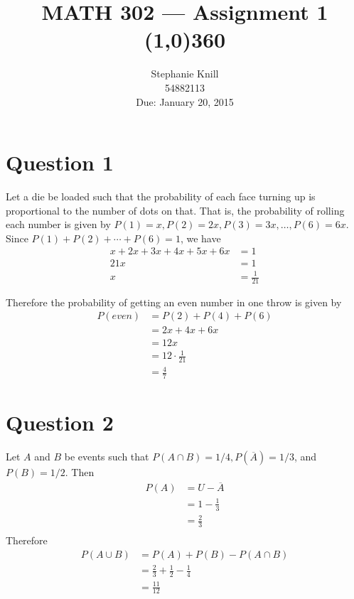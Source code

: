 \documentclass[11pt, oneside]{article}   	%
\begin{document}
\title{MATH 302 --- Assignment 1 \\
\line(1,0){360} \\              %
\vspace{0.2cm}}
\author{
Stephanie Knill \\
54882113 \\
Due: January 20, 2015}

\date{}                   %
\maketitle

\thispagestyle{empty}                   %



\section*{Question 1}

Let a die be loaded such that the probability of each face turning up is proportional to the number of dots on that. That is, the probability of rolling each number is given by $P(1)=x, P(2)=2x, P(3)=3x, \ldots , P(6)=6x$. Since $P(1) + P(2) + \cdots + P(6) = 1$, we have
\begin{align*}
x+2x+3x+4x+5x+6x & = 1 \\
21x & = 1 \\
x & = \frac{1}{21}
\end{align*}

Therefore the probability of getting an even number in one throw is given by
\begin{align*}
P(even) & = P(2)+P(4)+P(6) \\
& = 2x+4x+6x \\
& = 12x \\
& = 12 \cdot \frac{1}{21} \\
& = \frac{4}{7}
\end{align*}


\section*{Question 2}

Let $A$ and $B$ be events such that $P(A \cap B) = 1/4, P(\overline{A}) =1/3$, and $P(B)=1/2$. Then
\begin{align*}
P(A) & = U - \overline{A} \\
& = 1 - \frac{1}{3} \\
& = \frac{2}{3} \\
\end{align*}
Therefore
\begin{align*}
P(A \cup B) & = P(A) + P(B) - P(A \cap B) \\
& = \frac{2}{3} + \frac{1}{2} - \frac{1}{4} \\
& = \frac{11}{12}
\end{align*}
\end{document}
